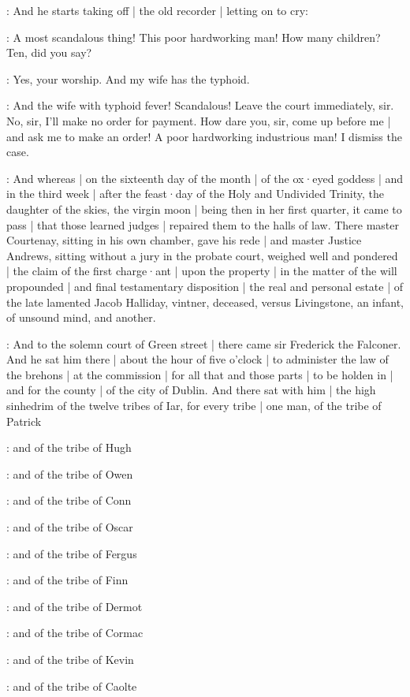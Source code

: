 \Nq:
And he starts taking off |
the old recorder |
letting on to cry:

\bergan:
A most scandalous thing!
This poor hardworking man!
How many children?
Ten,
did you say?

\bergan:
Yes,
your worship.
And my wife has the typhoid.

\bergan:
And the wife with typhoid fever!
Scandalous!
Leave the court immediately,
sir.
No,
sir,
I'll make no order for payment.
How dare you,
sir,
come up before me |
and ask me to make an order!
A poor hardworking industrious man!
I dismiss the case.

:
And whereas |
on the sixteenth day of the month |
of the ox·eyed goddess |
and in the third week |
after the feast·day of the Holy and Undivided Trinity,
the daughter of the skies,
the virgin moon |
being then in her first quarter,
it came to pass |
that those learned judges |
repaired them to the halls of law.
There master Courtenay,
sitting in his own chamber,
gave his rede |
and master Justice Andrews,
sitting without a jury in the probate court,
weighed well and pondered |
the claim of the first charge·ant |
upon the property |
in the matter of the will propounded |
and final testamentary disposition |
 the real and personal estate |
of the late lamented Jacob Halliday,
vintner,
deceased,
versus Livingstone,
an infant,
of unsound mind,
and another.

:
And to the solemn court of Green street |
there came sir Frederick the Falconer.
And he sat him there |
about the hour of five o'clock |
to administer the law of the brehons |
at the commission |
for all that and those parts |
to be holden in |
and for the county |
of the city of Dublin.
And there sat with him |
the high sinhedrim of the twelve tribes of Iar,
for every tribe |
one man,
of the tribe of Patrick

:
and of the tribe of Hugh

:
and of the tribe of Owen

:
and of the tribe of Conn

:
and of the tribe of Oscar

:
and of the tribe of Fergus

:
and of the tribe of Finn

:
and of the tribe of Dermot

:
and of the tribe of Cormac

:
and of the tribe of Kevin

:
and of the tribe of Caolte

